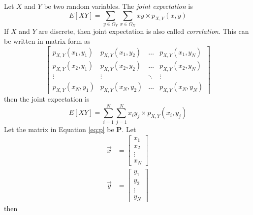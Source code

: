 Let $X$ and $Y$ be two random variables.
The \emph{joint expectation} is
\begin{equation}
    E[XY] = \sum_{y\in \Omega_Y}\sum_{x\in \Omega_X}xy \times p_{X,Y}(x,y)
\end{equation}
If $X$ and $Y$ are discrete, then joint
expectation is also called \emph{correlation}.
This can be written in matrix form as
\begin{equation}\label{eq:p}
    \begin{bmatrix}
        p_{X,Y}(x_1, y_1) & p_{X,Y}(x_1, y_2) & \dots  & p_{X,Y}(x_1, y_N) \\
        p_{X,Y}(x_2, y_1) & p_{X,Y}(x_2, y_2) & \dots  & p_{X,Y}(x_2, y_N) \\
        \vdots            & \vdots            & \ddots & \vdots            \\
        p_{X,Y}(x_N, y_1) & p_{X,Y}(x_N, y_2) & \dots  & p_{X,Y}(x_N, y_N)
    \end{bmatrix}
\end{equation}
then the joint expectation is
\begin{equation}
    E[XY] = \sum_{i=1}^{N}\sum_{j=1}^{N}x_i y_j \times p_{X,Y}(x_i, y_j)
\end{equation}
Let the matrix in Equation \ref{eq:p} be $\mathbf{P}$.
Let
\begin{align}
    \vec{x} & = \begin{bmatrix}
                    x_1    \\
                    x_2    \\
                    \vdots \\
                    x_N
                \end{bmatrix} \\
    \vec{y} & = \begin{bmatrix}
                    y_1    \\
                    y_2    \\
                    \vdots \\
                    y_N
                \end{bmatrix}
\end{align}
then
